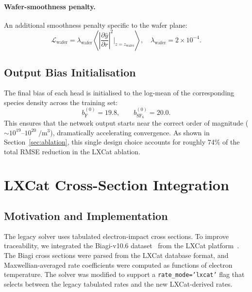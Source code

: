 \documentclass[12pt,a4paper]{article}
\begin{document}
\paragraph{Wafer-smoothness penalty.}
An additional smoothness penalty specific to the wafer plane:
\begin{equation}
  \mathcal{L}_{\text{wafer}}
  = \lambda_{\text{wafer}}
    \left\langle
      \left|\frac{\partial \hat{y}}{\partial r}\right|^2
      \bigg|_{z = z_{\text{wafer}}}
    \right\rangle,
  \quad \lambda_{\text{wafer}} = 2 \times 10^{-4}.
  \label{eq:wafer_smooth}
\end{equation}

\subsection{Output Bias Initialisation}

The final bias of each head is initialised to the log-mean of the
corresponding species density across the training set:
\begin{equation}
  b_{\text{F}}^{(0)} = 19.8, \qquad
  b_{\text{SF}_6}^{(0)} = 20.0.
  \label{eq:bias_init}
\end{equation}
This ensures that the network output starts near the correct order of
magnitude ($\sim 10^{19}$--$10^{20}\;\si{\per\cubic\metre}$),
dramatically accelerating convergence.  As shown in
Section~\ref{sec:ablation}, this single design choice accounts for
roughly 74\% of the total RMSE reduction in the LXCat ablation.

\section{LXCat Cross-Section Integration}
\label{sec:lxcat}

\subsection{Motivation and Implementation}

The legacy solver uses tabulated electron-impact cross sections.
To improve traceability, we integrated the Biagi-v10.6
dataset~\citep{biagi} from the LXCat platform~\citep{lxcat}.  The
Biagi cross sections were parsed from the LXCat database format, and
Maxwellian-averaged rate coefficients were computed as functions of
electron temperature.  The solver was modified to support a
\texttt{rate\_mode='lxcat'} flag that selects between the legacy
tabulated rates and the new LXCat-derived rates.
\end{document}
